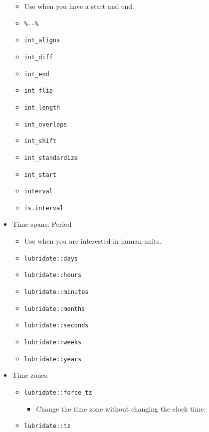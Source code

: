 \documentclass[
]{book}
\providecommand{\tightlist}{%
  \setlength{\itemsep}{0pt}\setlength{\parskip}{0pt}}
\begin{document}
\begin{itemize}
  \begin{itemize}
  \tightlist
  \item
    Use when you have a start and end.
  \item
    \texttt{\%-\/-\%}
  \item
    \texttt{int\_aligns}
  \item
    \texttt{int\_diff}
  \item
    \texttt{int\_end}
  \item
    \texttt{int\_flip}
  \item
    \texttt{int\_length}
  \item
    \texttt{int\_overlaps}
  \item
    \texttt{int\_shift}
  \item
    \texttt{int\_standardize}
  \item
    \texttt{int\_start}
  \item
    \texttt{interval}
  \item
    \texttt{is.interval}
  \end{itemize}
\item
  Time spans: Period

  \begin{itemize}
  \tightlist
  \item
    Use when you are interested in human units.
  \item
    \texttt{lubridate::days}
  \item
    \texttt{lubridate::hours}
  \item
    \texttt{lubridate::minutes}
  \item
    \texttt{lubridate::months}
  \item
    \texttt{lubridate::seconds}
  \item
    \texttt{lubridate::weeks}
  \item
    \texttt{lubridate::years}
  \end{itemize}
\item
  Time zones:

  \begin{itemize}
  \tightlist
  \item
    \texttt{lubridate::force\_tz}

    \begin{itemize}
    \tightlist
    \item
      Change the time zone without changing the clock time.
    \end{itemize}
  \item
    \texttt{lubridate::tz}


\end{itemize}
\end{itemize}
\end{document}
